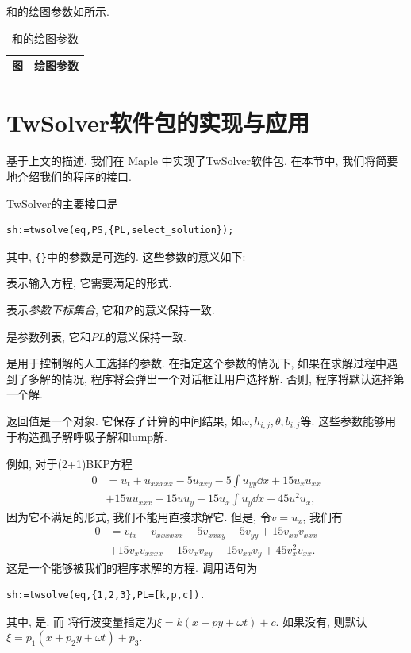 和的绘图参数如所示.

\begin{table}
\centering 
\caption{和的绘图参数\label{jm-plist}}
\small
\renewcommand{\arraystretch}{1.1}
\begin{tabular}{cp{}}
\hline 
图 & \multicolumn{1}{c}{绘图参数} \\ 
\hline 

\hline
\end{tabular}
\end{table}

\section{TwSolver软件包的实现与应用}
基于上文的描述, 我们在 Maple 中实现了TwSolver软件包. 在本节中, 我们将简要地介绍我们的程序的接口. 

TwSolver的主要接口是 
\begin{verbatim}
sh:=twsolve(eq,PS,{PL,select_solution});
\end{verbatim}
其中, \verb|{}|中的参数是可选的. 这些参数的意义如下: 
\begin{compactitem}[\textbullet]
\item {}表示输入方程, 它需要满足的形式.
\item {}表示\emph{参数下标集合}, 它和$\mathcal{P}$的意义保持一致. 
\item {}是参数列表, 它和$PL$的意义保持一致.
\item {}是用于控制解的人工选择的参数. 在指定这个参数的情况下, 如果在求解过程中遇到了多解的情况, 程序将会弹出一个对话框让用户选择解. 否则, 程序将默认选择第一个解.
\item 返回值是一个对象. 它保存了计算的中间结果, 如$\omega,h_{i,j},\theta,b_{i,j}$等. 这些参数能够用于构造孤子解\D 呼吸子解和lump解. 
\end{compactitem}
    
例如, 对于(2+1)BKP方程\CITEbaBKP
\begin{equation}
\begin{split}
0&=u_t+u_{xxxxx}-5u_{xxy}-5\int{u_{yy}\dd{x}}+15u_xu_{xx}\\
&+15uu_{xxx}-15uu_y-15u_x\int{u_y\dd{x}}+45u^2u_x, \label{BKP}
\end{split}
\end{equation}
因为它不满足的形式, 我们不能用直接求解它. 但是, 令$v=u_x$, 我们有
\begin{equation}
\begin{split}
0&=v_{tx}+v_{xxxxxx}-5v_{xxxy}-5v_{yy}+15v_{xx}v_{xxx}\\
&+15v_xv_{xxxx}-15v_xv_{xy}-15v_{xx}v_y+45v_x^2v_{xx}. \label{BKP-T}
\end{split}
\end{equation}
这是一个能够被我们的程序求解的方程. 调用语句为
\begin{verbatim}
sh:=twsolve(eq,{1,2,3},PL=[k,p,c]).
\end{verbatim}
其中, 是. 而 将行波变量指定为$\xi=k(x+py+\omega t)+c$. 如果没有, 则默认$\xi=p_1(x+p_2 y+\omega t)+p_3$. 

